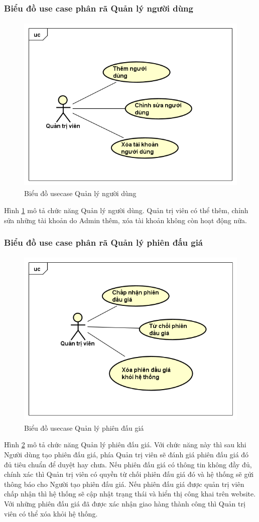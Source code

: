 \documentclass{article}
\begin{document}
\subsubsection{Biểu đồ use case phân rã Quản lý người dùng}
\begin{figure}[H]
    \centering
    \includegraphics[width=11.4cm,height=8.67cm]{images/uc quản lý người dùng.png}
    \caption{Biểu đồ usecase Quản lý người dùng}
    \label{hinh22}
\end{figure}
Hình \ref{hinh22} mô tả chức năng Quản lý người dùng. Quản trị viên có thể thêm, chỉnh sửa những tài khoản do Admin thêm, xóa tài khoản không còn hoạt động nữa.
\subsubsection{Biểu đồ use case phân rã Quản lý phiên đấu giá}
\begin{figure}[H]
    \centering
    \includegraphics[width=11.4cm,height=8.67cm]{images/uc quản lý phiên đấu giá.png}
    \caption{Biểu đồ usecase Quản lý phiên đấu giá}
    \label{hinh23}
\end{figure}
Hình \ref{hinh23} mô tả chức năng Quản lý phiên đấu giá. Với chức năng này thì sau khi Người dùng tạo phiên đấu giá, phía Quản trị viên sẽ đánh giá phiên đấu giá đó đủ tiêu chuẩn để duyệt hay chưa. Nếu phiên đấu giá có thông tin không đầy đủ, chính xác thì Quản trị viên có quyền từ chối phiên đấu giá đó và hệ thống sẽ gửi thông báo cho Người tạo phiên đấu giá. Nếu phiên đấu giá được quản trị viên chấp nhận thì hệ thống sẽ cập nhật trạng thái và hiển thị công khai trên website. Với những phiên đấu giá đã được xác nhận giao hàng thành công thì Quản trị viên có thể xóa khỏi hệ thống.
\end{document}
